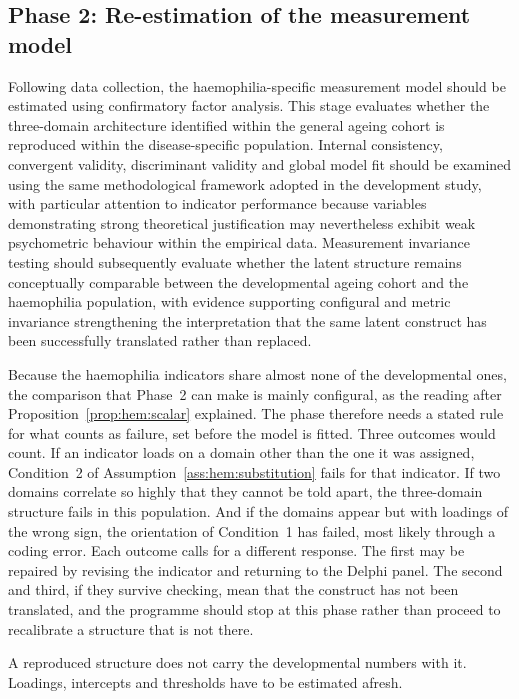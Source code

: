 \subsection{Phase 2: Re-estimation of the measurement model}

Following data collection, the haemophilia-specific measurement model should be estimated using confirmatory factor analysis. This stage evaluates whether the three-domain architecture identified within the general ageing cohort is reproduced within the disease-specific population. Internal consistency, convergent validity, discriminant validity and global model fit should be examined using the same methodological framework adopted in the development study, with particular attention to indicator performance because variables demonstrating strong theoretical justification may nevertheless exhibit weak psychometric behaviour within the empirical data. Measurement invariance testing should subsequently evaluate whether the latent structure remains conceptually comparable between the developmental ageing cohort and the haemophilia population, with evidence supporting configural and metric invariance strengthening the interpretation that the same latent construct has been successfully translated rather than replaced.

Because the haemophilia indicators share almost none of the developmental ones, the comparison that Phase~2 can make is mainly configural, as the reading after Proposition~\ref{prop:hem:scalar} explained. The phase therefore needs a stated rule for what counts as failure, set before the model is fitted. Three outcomes would count. If an indicator loads on a domain other than the one it was assigned, Condition~2 of Assumption~\ref{ass:hem:substitution} fails for that indicator. If two domains correlate so highly that they cannot be told apart, the three-domain structure fails in this population. And if the domains appear but with loadings of the wrong sign, the orientation of Condition~1 has failed, most likely through a coding error. Each outcome calls for a different response. The first may be repaired by revising the indicator and returning to the Delphi panel. The second and third, if they survive checking, mean that the construct has not been translated, and the programme should stop at this phase rather than proceed to recalibrate a structure that is not there.

A reproduced structure does not carry the developmental numbers with it.
Loadings, intercepts and thresholds have to be estimated afresh.


